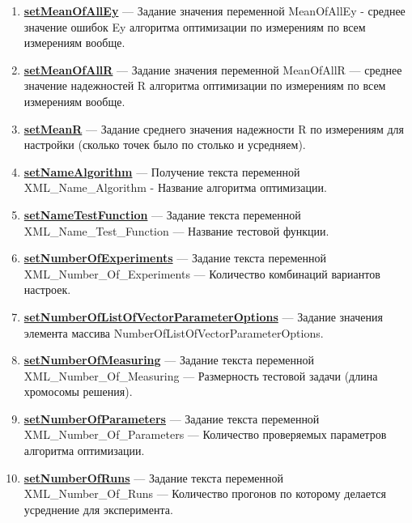 \documentclass[a4paper,12pt]{article}
\begin{document}
\begin{enumerate}
	\item \textbf{\hyperref[setMeanOfAllEy]{setMeanOfAllEy}} --- Задание значения переменной MeanOfAllEy - среднее значение ошибок Ey алгоритма оптимизации по измерениям по всем измерениям вообще.
	
	\item \textbf{\hyperref[setMeanOfAllR]{setMeanOfAllR}} --- Задание значения переменной MeanOfAllR --- среднее значение надежностей R алгоритма оптимизации по измерениям по всем измерениям вообще.
	
	\item \textbf{\hyperref[setMeanR]{setMeanR}} --- Задание среднего значения надежности R по измерениям для настройки (сколько точек было по столько и усредняем).
	
	\item \textbf{\hyperref[setNameAlgorithm]{setNameAlgorithm}} --- Получение текста переменной  XML\_Name\_Algorithm - Название алгоритма оптимизации.
	
	\item \textbf{\hyperref[setNameTestFunction]{setNameTestFunction}} --- Задание текста переменной  XML\_Name\_Test\_Function --- Название тестовой функции.
	
	\item \textbf{\hyperref[setNumberOfExperiments]{setNumberOfExperiments}} --- Задание текста переменной  XML\_Number\_Of\_Experiments --- Количество комбинаций вариантов настроек.
	
	\item \textbf{\hyperref[setNumberOfListOfVectorParameterOptions]{setNumberOfListOfVectorParameterOptions}} --- Задание значения элемента массива NumberOfListOfVectorParameterOptions.
	
	\item \textbf{\hyperref[setNumberOfMeasuring]{setNumberOfMeasuring}} --- Задание текста переменной  XML\_Number\_Of\_Measuring --- Размерность тестовой задачи (длина хромосомы решения).
	
	\item \textbf{\hyperref[setNumberOfParameters]{setNumberOfParameters}} --- Задание текста переменной  XML\_Number\_Of\_Parameters --- Количество проверяемых параметров алгоритма оптимизации.
	
	\item \textbf{\hyperref[setNumberOfRuns]{setNumberOfRuns}} --- Задание текста переменной  XML\_Number\_Of\_Runs --- Количество прогонов по которому делается усреднение для эксперимента.
	

\end{enumerate}
\end{document}
